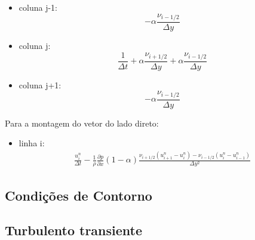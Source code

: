 \begin{itemize}
	\item{coluna j-1:}
		\begin{equation}
			-\alpha \frac{\nu_{i-1/2}}{\Delta y}
		\end{equation}
	\item{coluna j:}
		\begin{equation}
			\frac{1}{\Delta t} 
			+ \alpha \frac{\nu_{i+1/2}}{\Delta y}
			+ \alpha \frac{\nu_{i-1/2}}{\Delta y}
		\end{equation}
	\item{coluna j+1:}
		\begin{equation}
			-\alpha \frac{\nu_{i-1/2}}{\Delta y}
		\end{equation}
\end{itemize}

Para a montagem do vetor do lado direto:

\begin{itemize}
	\item{linha i:}
		\begin{eqnarray}
			\frac{u_i^{n}}{\Delta t} 
			-\frac{1}{\rho}\frac{\partial p}{\partial x} 
			(1-\alpha)\frac{\nu_{i+1/2}(u_{i+1}^n-u_{i}^n)
			-\nu_{i-1/2}(u_{i}^n-u_{i-1}^n)}{\Delta y^2}
			\label{eq:perfil_turbulento_discr}
		\end{eqnarray}
\end{itemize}

\subsection{Condições de Contorno}

\subsection{Turbulento transiente}





